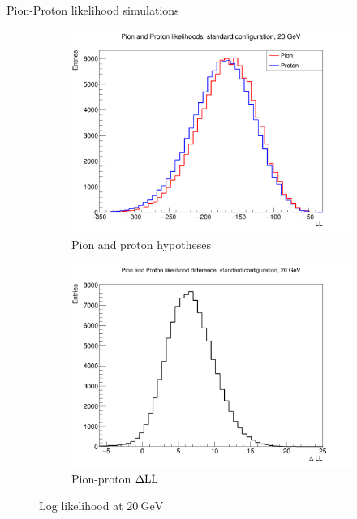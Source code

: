 \documentclass{beamer}
\begin{document}
\begin{frame}{Pion-Proton likelihood simulations}
  \begin{figure}
    \centering
    \vspace{-0.2cm}
    \begin{subfigure}{0.5\textwidth}
      \includegraphics[width = 1.0\textwidth]{Plots/ProtonPionLL20GeVStandard.png}
      \caption{Pion and proton hypotheses}
    \end{subfigure}%
    \begin{subfigure}{0.5\textwidth}
      \includegraphics[width = 1.0\textwidth]{Plots/ProtonPionDLL20GeVStandard.png}
      \caption{Pion-proton $\Delta{\rm LL}$}
    \end{subfigure}
    \caption{Log likelihood at $\SI{20}{\giga\eV}$}
  \end{figure}
\end{frame}
\end{document}
